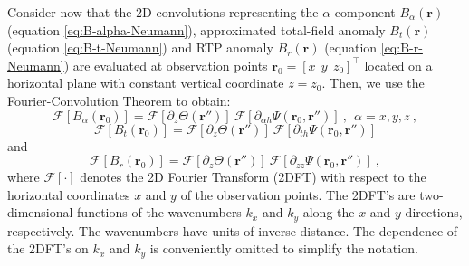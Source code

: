 Consider now that the 2D convolutions representing the 
$\alpha$-component $B_{\alpha}(\mathbf{r})$ (equation \ref{eq:B-alpha-Neumann}),
approximated total-field anomaly $B_{t}(\mathbf{r})$ (equation \ref{eq:B-t-Neumann}) 
and RTP anomaly $B_{r}(\mathbf{r})$ (equation \ref{eq:B-r-Neumann}) are 
evaluated at observation points $\mathbf{r}_{0} = \left[x \:\: y \:\: z_{0} \right]^{\top}$ 
located on a horizontal plane with constant vertical coordinate $z = z_{0}$. 
Then, we use the Fourier-Convolution Theorem \cite[][ p. 268]{blakely1996} to obtain:
\begin{equation}
\mathcal{F}\left[ B_{\alpha}(\mathbf{r}_{0}) \right] = 
\mathcal{F}\left[ \partial_{z} \Theta(\mathbf{r}'') \right] \: 
\mathcal{F}\left[ \partial_{\alpha h} \Psi(\mathbf{r}_{0}, \mathbf{r}'') \right] \: ,
\:\: \alpha = x, y, z \: ,
\label{eq:Fourier-B-alpha}
\end{equation}
\begin{equation}
\mathcal{F}\left[ B_{t}(\mathbf{r}_{0}) \right] = 
\mathcal{F}\left[ \partial_{z} \Theta(\mathbf{r}'') \right] \: 
\mathcal{F}\left[ \partial_{th} \Psi(\mathbf{r}_{0}, \mathbf{r}'') \right]
\label{eq:Fourier-B-t}
\end{equation}
and
\begin{equation}
\mathcal{F}\left[ B_{r}(\mathbf{r}_{0}) \right] = 
\mathcal{F}\left[ \partial_{z} \Theta(\mathbf{r}'') \right] \: 
\mathcal{F}\left[ \partial_{zz} \Psi(\mathbf{r}_{0}, \mathbf{r}'') \right] \: ,
\label{eq:Fourier-B-r}
\end{equation}
where $\mathcal{F}\left[ \cdot \right]$ denotes the 2D Fourier Transform (2DFT)
with respect to the horizontal coordinates $x$ and $y$ of the observation points.
The 2DFT's are two-dimensional functions of the wavenumbers $k_{x}$ and $k_{y}$ 
along the $x$ and $y$ directions, respectively. The wavenumbers have units of 
inverse distance. The dependence of the 2DFT's on $k_{x}$ and $k_{y}$ is conveniently
omitted to simplify the notation.

